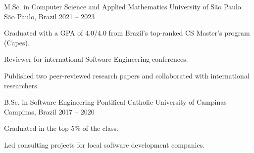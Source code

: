 
\begin{cventries}

  \cventry
    {M.Sc. in Computer Science and Applied Mathematics} %
    {University of São Paulo} %
    {São Paulo, Brazil} %
    {2021 -- 2023} %
    {
      \begin{cvitems}
        \item {Graduated with a GPA of 4.0/4.0 from Brazil's top-ranked CS Master's program (Capes).}
        \item {Reviewer for international Software Engineering conferences.}
        \item {Published two peer-reviewed research papers and collaborated with international researchers.}
      \end{cvitems}
    }

  \cventry
    {B.Sc. in Software Engineering} %
    {Pontifical Catholic University of Campinas} %
    {Campinas, Brazil} %
    {2017 -- 2020} %
    {
      \begin{cvitems}
        \item {Graduated in the top 5\% of the class.}
        \item {Led consulting projects for local software development companies.}
      \end{cvitems}
    }

\end{cventries}
